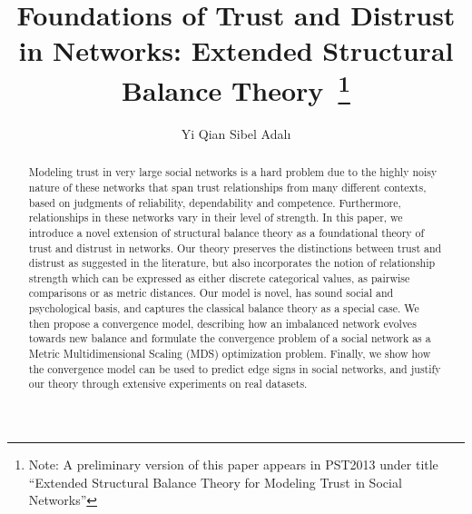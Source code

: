 \documentclass[acmtweb]{acmsmall}
\begin{document}

\title{Foundations of Trust and Distrust in Networks: Extended Structural Balance Theory~\footnote{Note: A preliminary version of
    this paper appears in PST2013 under title ``Extended Structural
    Balance Theory for Modeling Trust in Social Networks''}}

\author{
Yi Qian
Sibel Adal{\i}
}

\begin{abstract}
Modeling trust in very large social networks is a hard problem due to
the highly noisy nature of these networks that span trust
relationships from many different contexts, based on judgments of
reliability, dependability and competence. Furthermore, relationships
in these networks vary in their level of strength. In this paper, we
introduce a novel extension of structural balance theory as a
foundational theory of trust and distrust in networks. Our theory
preserves the distinctions between trust and distrust as suggested in
the literature, but also incorporates the notion of relationship
strength which can be expressed as either discrete categorical values,
as pairwise comparisons or as metric distances. Our model is novel,
has sound social and psychological basis, and captures the classical
balance theory as a special case. We then propose a convergence model,
describing how an imbalanced network evolves towards new balance and
formulate the convergence problem of a social network as a Metric
Multidimensional Scaling (MDS) optimization problem.  Finally, we show
how the convergence model can be used to predict edge signs in social
networks, and justify our theory through extensive experiments on real
datasets.
\end{abstract}





\end{document}
